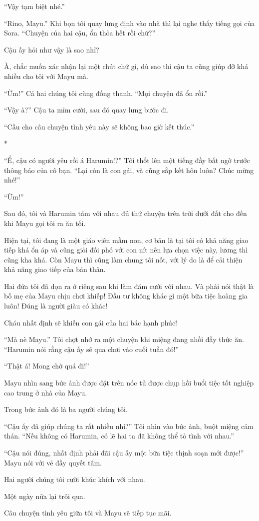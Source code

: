 {    ``Vậy tạm biệt nhé.''

    ``Rino, Mayu.'' Khi bọn tôi quay lưng định vào nhà thì lại nghe thấy
    tiếng gọi của Sora. ``Chuyện của hai cậu, ổn thỏa hết rồi chứ?''

    Cậu ấy hỏi như vậy là sao nhỉ?

    À, chắc muốn xác nhận lại một chút chứ gì, dù sao thì cậu ta cũng giúp
    đỡ khá nhiều cho tôi với Mayu mà.

    ``Ừm!'' Cả hai chúng tôi cùng đồng thanh. ``Mọi chuyện đã ổn rồi.''

    ``Vậy à?'' Cậu ta mỉm cười, sau đó quay lưng bước đi.

    ``Cầu cho câu chuyện tình yêu này sẽ không bao giờ kết thúc.''

    *

    ``Ể, cậu có người yêu rồi á Harumin!?'' Tôi thốt lên một tiếng đầy bất
    ngờ trước thông báo của cô bạn. ``Lại còn là con gái, và cũng sắp kết
    hôn luôn? Chúc mừng nhé!''

    ``Ừm!''

    Sau đó, tôi và Harumin tám với nhau đủ thứ chuyện trên trời dưới đất cho
    đến khi Mayu gọi tôi ra ăn tối.

    Hiện tại, tôi đang là một giáo viên mầm non, cơ bản là tại tôi có khả
    năng giao tiếp khá ổn áp và cũng giỏi đối phó với con nít nên lựa chọn
    việc này, lương thì cũng kha khá. Còn Mayu thì cũng làm chung tôi nốt,
    với lý do là để cải thiện khả năng giao tiếp của bản thân.

    Hai đứa tôi đã dọn ra ở riêng sau khi làm đám cưới với nhau. Và phải nói
    thật là bố mẹ của Mayu chịu chơi khiếp! Đầu tư không khác gì một bữa
    tiệc hoàng gia luôn! Đúng là người giàu có khác!

    Cháu nhất định sẽ khiến con gái của hai bác hạnh phúc!

    ``Mà nè Mayu.'' Tôi chợt nhớ ra một chuyện khi miệng đang nhồi đầy thức
    ăn. ``Harumin nói rằng cậu ấy sẽ qua chơi vào cuối tuần đó!''

    ``Thật á! Mong chờ quá đi!''

    Mayu nhìn sang bức ảnh được đặt trên nóc tủ được chụp hồi buổi tiệc tốt
    nghiệp cao trung ở nhà của Mayu.

    Trong bức ảnh đó là ba người chúng tôi.

    ``Cậu ấy đã giúp chúng ta rất nhiều nhỉ?'' Tôi nhìn vào bức ảnh, buột
    miệng cảm thán. ``Nếu không có Harumin, có lẽ hai ta đã không thể tỏ
    tình với nhau.''

    ``Cậu nói đúng, nhất định phải đãi cậu ấy một bữa tiệc thịnh soạn mới
    được!'' Mayu nói với vẻ đầy quyết tâm.

    Hai người chúng tôi cười khúc khích với nhau.

    Một ngày nữa lại trôi qua.

    Câu chuyện tình yêu giữa tôi và Mayu sẽ tiếp tục mãi.

}